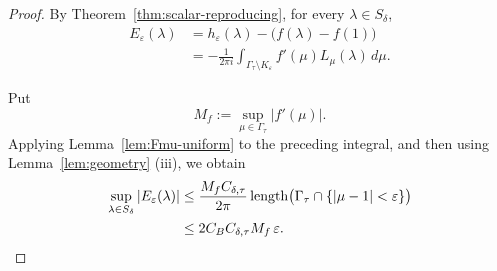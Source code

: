 \documentclass[10pt,a4paper]{amsart}
\begin{document}
\begin{proof}

By Theorem~\ref{thm:scalar-reproducing}, for every
$\lambda\in S_\delta$,
\[
\begin{aligned}
    E_\varepsilon(\lambda)
    &=
    h_\varepsilon(\lambda)
    -
    \bigl(f(\lambda)-f(1)\bigr)
    \\
    &=
    -\frac{1}{2\pi i}
    \int_{\Gamma_\tau\setminus K_\varepsilon}
         f'(\mu)L_\mu(\lambda)\,d\mu.
\end{aligned}
\]


Put
\[
    M_f:=\sup_{\mu\in\Gamma_\tau}|f'(\mu)|.
\]
Applying Lemma~\ref{lem:Fmu-uniform} to the preceding integral, and then
using Lemma~\ref{lem:geometry} \textup{(iii)}, we obtain
\[
\begin{aligned}
    \sup_{\lambda\in S_\delta}|E_\varepsilon(\lambda)|
    &\le
    \frac{M_fC_{\delta,\tau}}{2\pi}
    \operatorname{length}
    \bigl(
        \Gamma_\tau\cap\{|\mu-1|<\varepsilon\}
    \bigr)
    \\
    &\le
    2C_{\rm B}C_{\delta,\tau}M_f\,\varepsilon.
\end{aligned}
\]



\end{proof}
\end{document}
